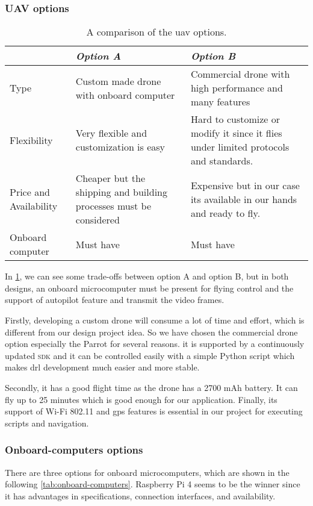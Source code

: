 \documentclass[../main.tex]{subfiles}
\begin{document}
\subsubsection{UAV options}
\begin{table}[H]
	\centering
	\caption{A comparison of the \gls{uav} options.}
	\label{tab:alt-solutions}
	\begin{tabularx}{\textwidth}{ p{4cm} X X }
		\toprule
		\textit{} & \textit{Option A} & \textit{Option B}\\ \midrule
		Type  & Custom made drone with onboard computer & Commercial drone with high performance and many features    \\
		Flexibility & Very flexible and customization is easy & Hard to customize or modify it since it flies under limited protocols and standards. \\
		
		Price and Availability & Cheaper but the shipping and building processes must be considered & Expensive but in our case its available in our hands and ready to fly.   \\
		
		Onboard computer & Must have & Must have \\
		\bottomrule
	\end{tabularx}
\end{table} 

In \cref{tab:alt-solutions}, 
we can see some trade-offs 
between option A and option B, but in both designs, 
an onboard microcomputer must be present for 
flying control and the support of autopilot feature and 
transmit the video frames. 


Firstly, developing a custom drone will consume a lot of time and effort, 
which is different from our design project idea.
So we have chosen the commercial drone option especially 
the Parrot \anafi for several reasons.
it is supported by a continuously updated 
\textsc{sdk} and it can be controlled easily 
with a simple Python script which makes 
\gls{drl} development much easier and more stable. 

Secondly, it has a good flight time 
as the \anafi drone has a 2700 mAh battery. 
It can fly up to 25 minutes which is good enough 
for our application.
Finally, its support of Wi-Fi 802.11 and \gls{gps} 
features is essential in our project for 
executing scripts and navigation.

\subsubsection{Onboard-computers options}
There are three options for onboard microcomputers, 
which are shown in the following 
\cref{tab:onboard-computers}. Raspberry Pi 4 seems 
to be the winner since it has advantages 
in specifications, connection interfaces, 
and availability.
\end{document}
